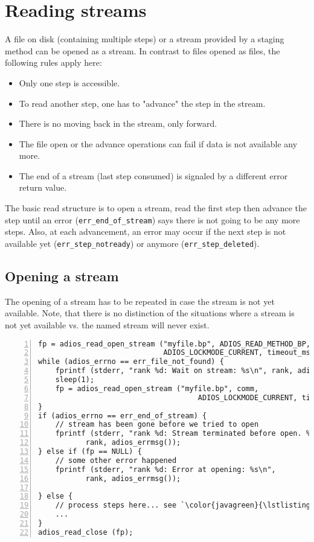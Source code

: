 \section{Reading streams}
A file on disk (containing multiple steps) or a stream provided by a staging method can be opened as a stream. In contrast to files opened as files, the following rules apply here:

  \begin{itemize}
  \item Only one step is accessible.
  \item To read another step, one has to "advance" the step in the stream.
  \item There is no moving back in the stream, only forward.
  \item The file open or the advance operations can fail if data is not available any more.
  \item The end of a stream (last step consumed) is signaled by a different error return value.
  \end{itemize}

The basic read structure is to open a stream, read the first step then advance the step until an error (\verb+err_end_of_stream+) says there is not going to be any more steps. Also, at each advancement, an error may occur if the next step is not available yet (\verb+err_step_notready+) or anymore (\verb+err_step_deleted+).


\subsection{Opening a stream}
The opening of a stream has to be repeated in case the stream is not yet available. Note, that there is no distinction of the situations where a stream is not yet available vs. the named stream will never exist.

\begin{lstlisting}[numbers=left, numberstyle=\color{gray}, stepnumber=2,
                             caption={While loop to open a stream},  label=code:open_stream]
fp = adios_read_open_stream ("myfile.bp", ADIOS_READ_METHOD_BP, comm, 
                             ADIOS_LOCKMODE_CURRENT, timeout_msec);
while (adios_errno == err_file_not_found) {
    fprintf (stderr, "rank %d: Wait on stream: %s\n", rank, adios_errmsg());
    sleep(1);
    fp = adios_read_open_stream ("myfile.bp", comm, 
                                     ADIOS_LOCKMODE_CURRENT, timeout_msec);
}
if (adios_errno == err_end_of_stream) {
    // stream has been gone before we tried to open
    fprintf (stderr, "rank %d: Stream terminated before open. %s\n",
           rank, adios_errmsg());
} else if (fp == NULL) {
    // some other error happened
    fprintf (stderr, "rank %d: Error at opening: %s\n",
           rank, adios_errmsg());

} else {
    // process steps here... see `\color{javagreen}{\lstlistingname~\ref{code:stream_stepbystep}}`
    ...
}
adios_read_close (fp);
\end{lstlisting}



